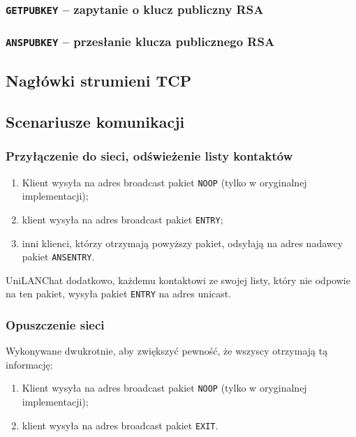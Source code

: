 \documentclass[11pt,leqno]{article}
\begin{document}

\subsubsection{\textnormal{\texttt{GETPUBKEY}} -- zapytanie o klucz publiczny RSA}
\subsubsection{\textnormal{\texttt{ANSPUBKEY}} -- przesłanie klucza publicznego RSA}

\subsection{Nagłówki strumieni TCP}

\subsection{Scenariusze komunikacji}

\subsubsection{Przyłączenie do sieci, odświeżenie listy kontaktów}

\begin{enumerate}
	\item Klient wysyła na adres broadcast pakiet \texttt{NOOP} (tylko w oryginalnej
	implementacji);
	\item klient wysyła na adres broadcast pakiet \texttt{ENTRY};
	\item inni klienci, którzy otrzymają powyższy pakiet, odsyłają na adres nadawcy
	pakiet \texttt{ANSENTRY}.
\end{enumerate}

UniLANChat dodatkowo, każdemu kontaktowi ze swojej listy, który nie odpowie na ten pakiet,
wysyła pakiet \texttt{ENTRY} na adres unicast.

\subsubsection{Opuszczenie sieci}

Wykonywane dwukrotnie, aby zwiększyć pewność, że wszyscy otrzymają tą informację:
\begin{enumerate}
	\item Klient wysyła na adres broadcast pakiet \texttt{NOOP} (tylko w oryginalnej
	implementacji);
	\item klient wysyła na adres broadcast pakiet \texttt{EXIT}.
\end{enumerate}
\end{document}
